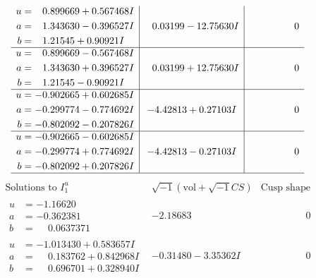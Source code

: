 \documentclass[1p]{elsarticle_modified}
\theoremstyle{definition}
\newcommand{\I}{\sqrt{-1}}
\begin{document}
$$\begin{array}{c|c|c}
\begin{aligned}
u &= \phantom{-}0.899669 + 0.567468 I \\
a &= \phantom{-}1.343630 - 0.396527 I \\
b &= \phantom{-}1.21545 + 0.90921 I\end{aligned}
 & \phantom{-}0.03199 - 12.75630 I & \phantom{-0.000000 } 0 \\ \hline\begin{aligned}
u &= \phantom{-}0.899669 - 0.567468 I \\
a &= \phantom{-}1.343630 + 0.396527 I \\
b &= \phantom{-}1.21545 - 0.90921 I\end{aligned}
 & \phantom{-}0.03199 + 12.75630 I & \phantom{-0.000000 } 0 \\ \hline\begin{aligned}
u &= -0.902665 + 0.602685 I \\
a &= -0.299774 - 0.774692 I \\
b &= -0.802092 - 0.207826 I\end{aligned}
 & -4.42813 + 0.27103 I & \phantom{-0.000000 } 0 \\ \hline\begin{aligned}
u &= -0.902665 - 0.602685 I \\
a &= -0.299774 + 0.774692 I \\
b &= -0.802092 + 0.207826 I\end{aligned}
 & -4.42813 - 0.27103 I & \phantom{-0.000000 } 0\\
 \hline 
 \end{array}$$\newpage$$\begin{array}{c|c|c}  
\text{Solutions to }I^u_{1}& \I (\text{vol} + \sqrt{-1}CS) & \text{Cusp shape}\\
 \hline 
\begin{aligned}
u &= -1.16620\phantom{ +0.000000I} \\
a &= -0.362381\phantom{ +0.000000I} \\
b &= \phantom{-}0.0637371\phantom{ +0.000000I}\end{aligned}
 & -2.18683\phantom{ +0.000000I} & \phantom{-0.000000 } 0 \\ \hline\begin{aligned}
u &= -1.013430 + 0.583657 I \\
a &= \phantom{-}0.183762 + 0.842968 I \\
b &= \phantom{-}0.696701 + 0.328940 I\end{aligned}
 & -0.31480 - 3.35362 I & \phantom{-0.000000 } 0 \\ \hline\begin{aligned}

\end{aligned}
\end{array}$$
\end{document}
